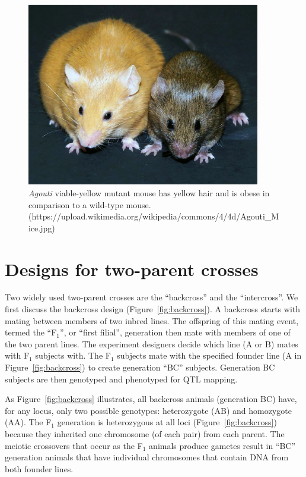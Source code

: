 \documentclass[oneside]{book}\usepackage[]{graphicx}\usepackage[]{color}
\begin{document}
\begin{figure}
\includegraphics[height=8cm]{figs/Agouti.jpg}
\caption{\emph{Agouti} viable-yellow mutant mouse has yellow hair and is obese in comparison to a wild-type mouse. (https://upload.wikimedia.org/wikipedia/commons/4/4d/Agouti\_Mice.jpg)}
\label{fig:agouti}
\end{figure}






\section{Designs for two-parent crosses}\label{sec:two-parent-designs}

Two widely used two-parent crosses are the ``backcross'' and the
``intercross''. We first discuss the backcross design
(Figure~\ref{fig:backcross}). A backcross starts with mating between
members of two inbred lines. The offspring of this mating event,
termed the ``F$_1$'', or ``first filial'', generation then mate
with members of one of the two parent lines. The experiment designers
decide which line (A or B) mates with F$_1$ subjects
with. The F$_1$ subjects mate with the specified founder line 
(A in Figure~\ref{fig:backcross}) to create generation ``BC'' subjects. 
Generation BC subjects are then genotyped and phenotyped for QTL mapping. 



As Figure~\ref{fig:backcross} illustrates, all backcross animals (generation
BC) have, for any locus, only two possible genotypes: heterozygote (AB)
and homozygote (AA).
The F$_1$ generation is heterozygous at all loci (Figure~\ref{fig:backcross}) because 
they inherited one chromosome (of each pair) from each parent.
The meiotic crossovers that occur as the F$_1$ animals produce gametes result in ``BC'' generation animals that have individual
chromosomes that contain DNA from both founder lines. 
\end{document}
